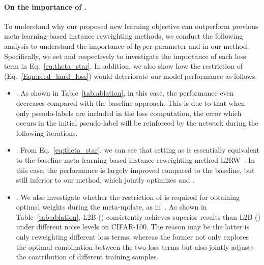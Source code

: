\documentclass{article}
\begin{document}
\paragraph{On the importance of .} To understand why our proposed new learning objective can outperform previous meta-learning-based instance reweighting methods, we conduct the following analysis to understand the importance of hyper-parameter  and  in our method. Specifically, we set  and  respectively to investigate the importance of each loss term in Eq.~\eqref{eq:theta_star}.
In addition, we also show how the restriction of  (Eq.~\eqref{Eqn:reed_hard_loss}) would deteriorate our model performance as follows. 
\begin{itemize}
   \item . As shown in Table~\ref{tab:ablation}, in this case, the performance even decreases compared with the baseline approach. 
   This is due to that when only pseudo-labels are included in the loss computation, the error which occurs in the initial pseudo-label will be reinforced by the network during the following iterations.
   \item . From Eq.~\eqref{eq:theta_star}, we can see that setting  as   is essentially equivalent to the baseline meta-learning-based instance reweighting method L2RW~\cite{ren2018learning}.
   In this case, the performance is largely improved compared to the baseline, but still inferior to our method, which jointly optimizes  and .
    
    
   \item  . We also investigate whether the restriction of  is required for obtaining optimal weights during the meta-update, as in~\cite{zhang2020distilling}. 
   As shown in Table~\ref{tab:ablation}, L2B () consistently achieves superior results than L2B () under different noise levels on CIFAR-100. The reason may be the latter is only reweighting different loss terms, whereas the former not only explores the optimal combination between the two loss terms but also jointly adjusts the contribution of different training samples.
\end{itemize}
  
\end{document}
